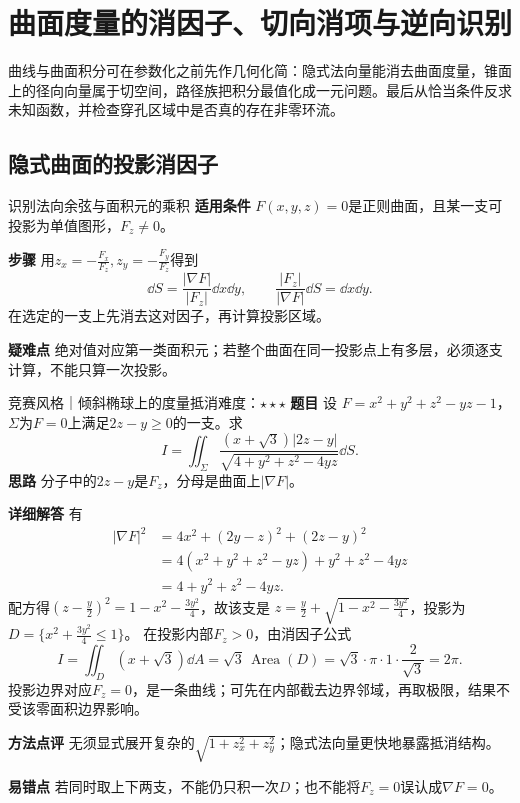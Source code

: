 \section{曲面度量的消因子、切向消项与逆向识别}\label{cf:section}
\begin{examtip}
曲线与曲面积分可在参数化之前先作几何化简：隐式法向量能消去曲面度量，锥面上的径向向量属于切空间，路径族把积分最值化成一元问题。最后从恰当条件反求未知函数，并检查穿孔区域中是否真的存在非零环流。
\end{examtip}

\subsection{隐式曲面的投影消因子}\label{cf:projection}
\begin{method}{识别法向余弦与面积元的乘积}
\textbf{适用条件} $F(x,y,z)=0$是正则曲面，且某一支可投影为单值图形，$F_z\ne0$。\par
\textbf{步骤} 用$z_x=-\frac{F_x}{F_z},z_y=-\frac{F_y}{F_z}$得到
\[
\dd S=\dfrac{|\nabla F|}{|F_z|}\dd x\dd y,
\qquad
\dfrac{|F_z|}{|\nabla F|}\dd S=\dd x\dd y.
\]
在选定的一支上先消去这对因子，再计算投影区域。\par
\textbf{疑难点} 绝对值对应第一类面积元；若整个曲面在同一投影点上有多层，必须逐支计算，不能只算一次投影。
\end{method}
\begin{example}{竞赛风格｜倾斜椭球上的度量抵消}{难度：$\star\star\star$}
\label{cf:ex:projection}
\textbf{题目} 设
$F=x^2+y^2+z^2-yz-1$，$\Sigma$为$F=0$上满足$2z-y\ge0$的一支。求
\[
I=\iint_\Sigma
\dfrac{(x+\sqrt3)|2z-y|}
{\sqrt{4+y^2+z^2-4yz}}\dd S.
\]
\textbf{思路} 分子中的$2z-y$是$F_z$，分母是曲面上$|\nabla F|$。\par
\textbf{详细解答} 有
\[
\begin{aligned}
|\nabla F|^2
&=4x^2+(2y-z)^2+(2z-y)^2\\
&=4(x^2+y^2+z^2-yz)+y^2+z^2-4yz\\
&=4+y^2+z^2-4yz.
\end{aligned}
\]
配方得$(z-\frac{y}{2})^2=1-x^2-\frac{3y^2}{4}$，故该支是
$z=\frac{y}{2}+\sqrt{1-x^2-\frac{3y^2}{4}}$，投影为
$D=\{x^2+\frac{3y^2}{4}\le1\}$。
在投影内部$F_z>0$，由消因子公式
\[
I=\iint_D(x+\sqrt3)\dd A
=\sqrt3\,\operatorname{Area}(D)
=\sqrt3\cdot\pi\cdot1\cdot\dfrac2{\sqrt3}=2\pi.
\]
投影边界对应$F_z=0$，是一条曲线；可先在内部截去边界邻域，再取极限，结果不受该零面积边界影响。\par
\textbf{方法点评} 无须显式展开复杂的$\sqrt{1+z_x^2+z_y^2}$；隐式法向量更快地暴露抵消结构。\par
\textbf{易错点} 若同时取上下两支，不能仍只积一次$D$；也不能将$F_z=0$误认成$\nabla F=0$。
\end{example}

